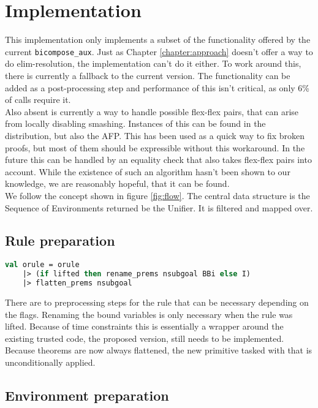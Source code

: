 \chapter{Implementation}\label{chapter:implementation}

This implementation only implements a subset of the functionality offered by the current \texttt{bicompose\_aux}. Just as Chapter \ref{chapter:approach} doesn't offer a way to do elim-resolution, the implementation can't do it either. To work around this, there is currently a fallback to the current version. The functionality can be added as a post-processing step and performance of this isn't critical, as only 6\% of calls require it.\\
Also absent is currently a way to handle possible flex-flex pairs, that can arise from locally disabling smashing. Instances of this can be found in the distribution, but also the AFP. This has been used as a quick way to fix broken proofs, but most of them should be expressible without this workaround. In the future this can be handled by an equality check that also takes flex-flex pairs into account. While the existence of such an algorithm hasn't been shown to our knowledge, we are reasonably hopeful, that it can be found.\\
We follow the concept shown in figure \ref{fig:flow}. The central data structure is the Sequence of Environments returned be the Unifier. It is filtered and mapped over. 


\section{Rule preparation}

\begin{lstlisting}[language=ML,breaklines=true]
 val orule = orule
    |> (if lifted then rename_prems nsubgoal BBi else I)
    |> flatten_prems nsubgoal
\end{lstlisting}

There are to preprocessing steps for the rule that can be necessary depending on the flags. Renaming the bound variables is only necessary when the rule was lifted. Because of time constraints this is essentially a wrapper around the existing trusted code, the proposed version, still needs to be implemented. Because theorems are now always flattened, the new primitive tasked with that is unconditionally applied.

\section{Environment preparation}

